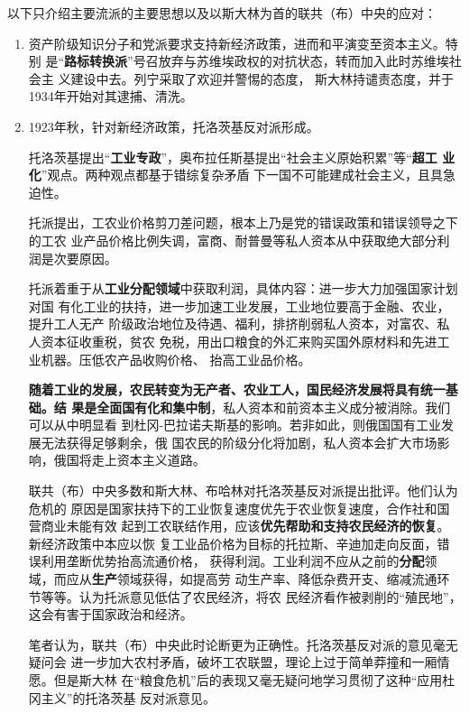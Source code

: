以下只介绍主要流派的主要思想以及以斯大林为首的联共（布）中央的应对：
\begin{enumerate}
\item 资产阶级知识分子和党派要求支持新经济政策，进而和平演变至资本主义。特别
  是“\textbf{路标转换派}”号召放弃与苏维埃政权的对抗状态，转而加入此时苏维埃社会主
  义建设中去。列宁采取了欢迎并警惕的态度，
  斯大林持谴责态度，并于1934年开始对其逮捕、清洗。\cite{wenyilubiao}

\item 1923年秋，针对新经济政策，托洛茨基反对派形成。

  托洛茨基提出“\textbf{工业专政}”，奥布拉任斯基提出“社会主义原始积累”等“\textbf{超工
    业化}”观点。两种观点都基于错综复杂矛盾
  下一国不可能建成社会主义，且具急迫性。

  托派提出，工农业价格剪刀差问题，根本上乃是党的错误政策和错误领导之下的工农
  业产品价格比例失调，富商、耐普曼等私人资本从中获取绝大部分利润是次要原因。

  托派着重于从\textbf{工业分配领域}中获取利润，具体内容：进一步大力加强国家计划对国
  有化工业的扶持，进一步加速工业发展，工业地位要高于金融、农业，提升工人无产
  阶级政治地位及待遇、福利，排挤削弱私人资本，对富农、私人资本征收重税，贫农
  免税，用出口粮食的外汇来购买国外原材料和先进工业机器。压低农产品收购价格、
  抬高工业品价格。

  \textbf{随着工业的发展，农民转变为无产者、农业工人，国民经济发展将具有统一基础。结
  果是全面国有化和集中制}，私人资本和前资本主义成分被消除。我们可以从中明显看
  到杜冈-巴拉诺夫斯基的影响。若非如此，则俄国国有工业发展无法获得足够剩余，俄
  国农民的阶级分化将加剧，私人资本会扩大市场影响，俄国将走上资本主义道路。

  联共（布）中央多数和斯大林、布哈林对托洛茨基反对派提出批评。他们认为危机的
  原因是国家扶持下的工业恢复速度优先于农业恢复速度，合作社和国营商业未能有效
  起到工农联结作用，应该\textbf{优先帮助和支持农民经济的恢复}。新经济政策中本应以恢
  复工业品价格为目标的托拉斯、辛迪加走向反面，错误利用垄断优势抬高流通价格，
  获得利润。工业利润不应从之前的\textbf{分配}领域，而应从\textbf{生产}领域获得，如提高劳
  动生产率、降低杂费开支、缩减流通环节等等。认为托派意见低估了农民经济，将农
  民经济看作被剥削的“殖民地”，这会有害于国家政治和经济。

  笔者认为，联共（布）中央此时论断更为正确性。托洛茨基反对派的意见毫无疑问会
  进一步加大农村矛盾，破坏工农联盟，理论上过于简单莽撞和一厢情愿。但是斯大林
  在“粮食危机”后的表现又毫无疑问地学习贯彻了这种“应用杜冈主义”的托洛茨基
  反对派意见。


\end{enumerate}

